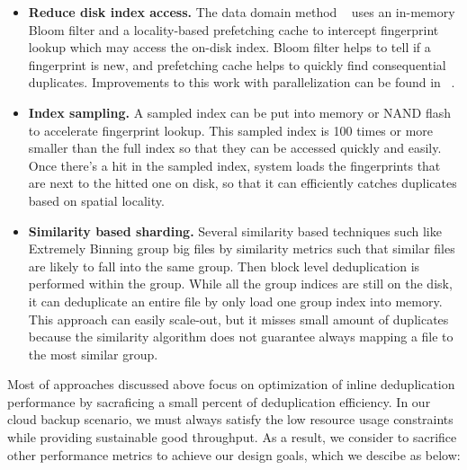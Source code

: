 \begin{itemize}
\item \textbf{Reduce disk index access.} The data domain method ~\cite{bottleneck08} 
uses an in-memory Bloom filter and a locality-based prefetching cache to intercept fingerprint lookup which may
access the on-disk index. Bloom filter\cite{Bonomi2006} helps to tell if a fingerprint is new, and prefetching cache
helps to quickly find consequential duplicates. Improvements to this work with parallelization can be found
 in ~\cite{MAD210,DEBAR,nath08}.
\item \textbf{Index sampling.} A sampled index can be 
put into memory\cite{sparseindex09} or NAND flash\cite{Guo2011} to accelerate fingerprint lookup. 
This sampled index is 100 times or more smaller than the full index so that 
they can be accessed quickly and easily.
Once there's a hit in the sampled index, system loads the fingerprints that are next to the hitted one on disk,
so that it can efficiently catches duplicates based on spatial locality.
\item \textbf{Similarity based sharding.} Several similarity based techniques\cite{shingling97} such like 
Extremely Binning\cite{extreme_binning09, Dong2011, Srinivasan2012, chord01} group big files by similarity metrics
such that similar files are likely to fall into the same group. Then block level deduplication is performed
within the group. While all the group indices are still on the disk, it can deduplicate an entire file
by only load one group index into memory. This approach can easily scale-out, but it misses small amount of duplicates 
because the similarity algorithm does not guarantee always mapping a file to the most similar group.
\end{itemize}

Most of approaches discussed above focus on optimization of inline deduplication
performance by sacraficing a small percent of deduplication efficiency.
In our cloud backup scenario, we must always satisfy the low resource usage constraints while 
providing sustainable good throughput. As a result, we consider to sacrifice other performance metrics 
to achieve our design goals, which we descibe as below:

